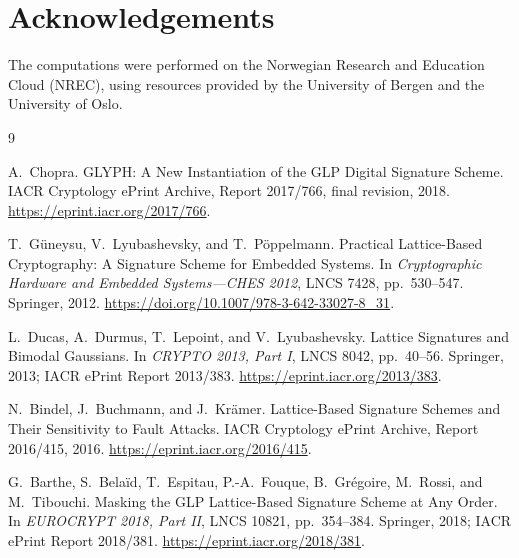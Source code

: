 \documentclass[10pt,a4paper]{article}
\begin{document}
\section*{Acknowledgements}
The computations were performed on the Norwegian Research and Education Cloud (NREC), using resources provided by the University of Bergen and the University of Oslo.

\begin{thebibliography}{9}

A.~Chopra.
\newblock GLYPH: A New Instantiation of the GLP Digital Signature Scheme.
\newblock IACR Cryptology ePrint Archive, Report 2017/766, final revision,
2018.
\newblock \url{https://eprint.iacr.org/2017/766}.

T.~G\"uneysu, V.~Lyubashevsky, and T.~P\"oppelmann.
\newblock Practical Lattice-Based Cryptography: A Signature Scheme for
Embedded Systems.
\newblock In \emph{Cryptographic Hardware and Embedded Systems---CHES 2012},
LNCS 7428, pp.~530--547. Springer, 2012.
\newblock \url{https://doi.org/10.1007/978-3-642-33027-8_31}.

L.~Ducas, A.~Durmus, T.~Lepoint, and V.~Lyubashevsky.
\newblock Lattice Signatures and Bimodal Gaussians.
\newblock In \emph{CRYPTO 2013, Part I}, LNCS 8042, pp.~40--56. Springer,
2013; IACR ePrint Report 2013/383.
\newblock \url{https://eprint.iacr.org/2013/383}.

N.~Bindel, J.~Buchmann, and J.~Kr\"amer.
\newblock Lattice-Based Signature Schemes and Their Sensitivity to Fault
Attacks.
\newblock IACR Cryptology ePrint Archive, Report 2016/415, 2016.
\newblock \url{https://eprint.iacr.org/2016/415}.

G.~Barthe, S.~Bela\"id, T.~Espitau, P.-A.~Fouque, B.~Gr\'egoire,
M.~Rossi, and M.~Tibouchi.
\newblock Masking the GLP Lattice-Based Signature Scheme at Any Order.
\newblock In \emph{EUROCRYPT 2018, Part II}, LNCS 10821, pp.~354--384.
Springer, 2018; IACR ePrint Report 2018/381.
\newblock \url{https://eprint.iacr.org/2018/381}.

\end{thebibliography}
\end{document}
